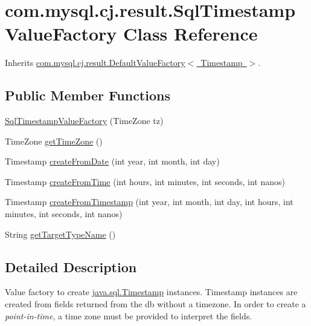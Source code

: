 \hypertarget{classcom_1_1mysql_1_1cj_1_1result_1_1_sql_timestamp_value_factory}{}\section{com.\+mysql.\+cj.\+result.\+Sql\+Timestamp\+Value\+Factory Class Reference}
\label{classcom_1_1mysql_1_1cj_1_1result_1_1_sql_timestamp_value_factory}


Inherits \mbox{\hyperlink{classcom_1_1mysql_1_1cj_1_1result_1_1_default_value_factory}{com.\+mysql.\+cj.\+result.\+Default\+Value\+Factory$<$ Timestamp $>$}}.

\subsection*{Public Member Functions}
\begin{DoxyCompactItemize}
\item 
\mbox{\hyperlink{classcom_1_1mysql_1_1cj_1_1result_1_1_sql_timestamp_value_factory_a443de10f7aa6daa9ecf3e43bcd6d21fb}{Sql\+Timestamp\+Value\+Factory}} (Time\+Zone tz)
\item 
Time\+Zone \mbox{\hyperlink{classcom_1_1mysql_1_1cj_1_1result_1_1_sql_timestamp_value_factory_a68ae23c7eb1c8944883b854ddf595a77}{get\+Time\+Zone}} ()
\item 
Timestamp \mbox{\hyperlink{classcom_1_1mysql_1_1cj_1_1result_1_1_sql_timestamp_value_factory_a87b52f4c2804aead4fd10c776c88295a}{create\+From\+Date}} (int year, int month, int day)
\item 
Timestamp \mbox{\hyperlink{classcom_1_1mysql_1_1cj_1_1result_1_1_sql_timestamp_value_factory_a8fbb0901790f2aa3a7175ba7f1f5727d}{create\+From\+Time}} (int hours, int minutes, int seconds, int nanos)
\item 
Timestamp \mbox{\hyperlink{classcom_1_1mysql_1_1cj_1_1result_1_1_sql_timestamp_value_factory_a78551233e571fb77da40368363d35cca}{create\+From\+Timestamp}} (int year, int month, int day, int hours, int minutes, int seconds, int nanos)
\item 
String \mbox{\hyperlink{classcom_1_1mysql_1_1cj_1_1result_1_1_sql_timestamp_value_factory_a08bd94d6bde7df9a086111e17b86d60a}{get\+Target\+Type\+Name}} ()
\end{DoxyCompactItemize}


\subsection{Detailed Description}
Value factory to create \mbox{\hyperlink{}{java.\+sql.\+Timestamp}} instances. Timestamp instances are created from fields returned from the db without a timezone. In order to create a {\itshape point-\/in-\/time}, a time zone must be provided to interpret the fields. 

